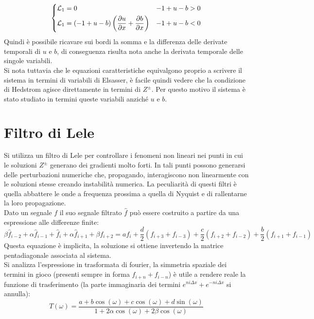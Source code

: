 \[
    \begin{dcases}
	\mathcal{L}_1 = 0 & -1 + u - b > 0\\
	\mathcal{L}_1 = (-1+u-b)\left(\frac{\partial u}{\partial x} + \frac{\partial b}{\partial x}\right) & -1 + u - b < 0\\
    \end{dcases}
\]
Quindi è possibile ricavare sui bordi la somma e la differenza delle derivate temporali di $u$ e $b$, di conseguenza risulta nota anche la derivata temporale delle singole variabili.\\
Si nota tuttavia che le equazioni caratteristiche equivalgono proprio a scrivere il sistema in termini di variabili di Elsasser, è facile quindi vedere che la condizione di Hedstrom agisce direttamente in termini di $Z^{\pm}$. Per questo motivo il sistema è stato studiato in termini queste variabili anziché $u$ e $b$.
\section{Filtro di Lele}
Si utilizza un filtro di Lele per controllare i fenomeni non lineari nei punti in cui le soluzioni $Z^{\pm}$ generano dei gradienti molto forti. In tali punti possono generarsi delle perturbazioni numeriche che, propagando, interagiscono non linearmente con le soluzioni stesse creando instabilità numerica. 
La peculiarità di questi filtri è quella abbattere le onde a frequenza prossima a quella di Nyquist e di rallentarne la loro propagazione. \\
Dato un segnale $f$ il suo segnale filtrato $\hat{f}$ può essere costruito a partire da una espressione alle differenze finite:
\begin{equation}
    \beta \hat{f}_{i-2} + \alpha \hat{f}_{i-1} +\hat{ f}_i + \alpha\hat{ f}_{i+1} + \beta f_{i+2} = 
    a f_i + \frac{d}{2} \left(f_{i+3} + f_{i-3} \right) + \frac{c}{2} \left(f_{i+2} + f_{i-2} \right) + \frac{b}{2} \left(f_{i+1} + f_{i-1} \right)
    \label{eq:lelefilter}
\end{equation}
Questa equazione è implicita, la soluzione si ottiene invertendo la matrice pentadiagonale associata al sistema.\\
Si analizza l'espressione in trasformata di fourier, la simmetria spaziale dei termini in gioco (presenti sempre in forma $f_{i+n} + f_{i-n}$) è utile a rendere reale la funzione di trasferimento (la parte immaginaria dei termini $e^{ni\Delta x} + e^{-ni\Delta x}$ si annulla):
\[
    T(\omega) = \frac{a + b \cos (\omega) + c \cos(\omega) + d \sin(\omega)}{ 1 + 2\alpha\cos(\omega) + 2\beta\cos(\omega)}
\]
